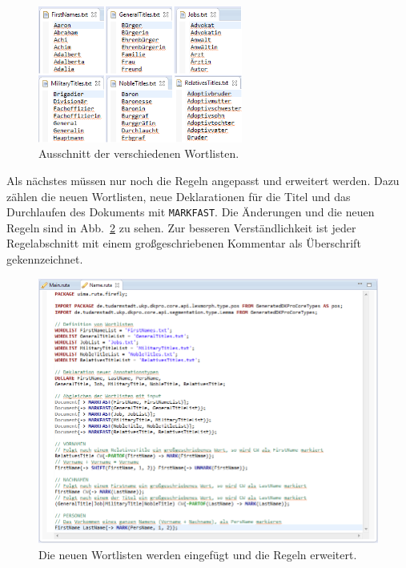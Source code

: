 \documentclass{article}
\begin{document}
\begin{figure}
\centering
\includegraphics[width=0.6\textwidth]{figs/tt_titles.png}
\caption{Ausschnitt der verschiedenen Wortlisten.}
\label{titles}
\end{figure}

Als nächstes müssen nur noch die Regeln angepasst und erweitert werden. Dazu zählen die neuen Wortlisten, neue Deklarationen für die Titel und das Durchlaufen des Dokuments mit \texttt{MARKFAST}. Die Änderungen und die neuen Regeln sind in Abb.~\ref{name2} zu sehen. Zur besseren Verständlichkeit ist jeder Regelabschnitt mit einem großgeschriebenen Kommentar als Überschrift gekennzeichnet.

\begin{figure}
\centering
\includegraphics[width=1\textwidth]{figs/tt_name2.png}
\caption{Die neuen Wortlisten werden eingefügt und die Regeln erweitert.}
\label{name2}
\end{figure}
\end{document}
